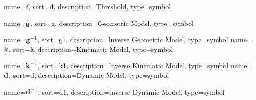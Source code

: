 	{%
		name={\ensuremath{\delta}},
		sort=d,
		description=Threshold,
		type=symbol
	}
	\newcommand{\threshold}{\gls{sym:threshold}}

	{%
		name={\ensuremath{\vecfunc{g}}},
		sort=g,
		description=Geometric Model,
		type=symbol
	}
	\newcommand{\geometricmodel}{\gls{sym:geometricmodel}}

	{%
		name={\ensuremath{{\vecfunc{g}^{-1}}}},
		sort=g1,
		description=Inverse Geometric Model,
		type=symbol
	}
	\newcommand{\invgeometricmodel}{\gls{sym:invgeometricmodel}}
	{%
		name={\ensuremath{\vecfunc{k}}},
		sort=k,
		description=Kinematic Model,
		type=symbol
	}
	\newcommand{\kinematicmodel}{\gls{sym:kinematicmodel}}

	{%
		name={\ensuremath{{\vecfunc{k}^{-1}}}},
		sort=k1,
		description=Inverse Kinematic Model,
		type=symbol
	}
	\newcommand{\invkinematicmodel}{\gls{sym:invkinematicmodel}}
	{%
		name={\ensuremath{\vecfunc{d}}},
		sort=d,
		description=Dynamic Model,
		type=symbol
	}
	\newcommand{\dynamicmodel}{\gls{sym:dynamicmodel}}

	{%
		name={\ensuremath{{\vecfunc{d}^{-1}}}},
		sort=d1,
		description=Inverse Dynamic Model,
		type=symbol
	}
	\newcommand{\invdynamicmodel}{\gls{sym:invdynamicmodel}}

